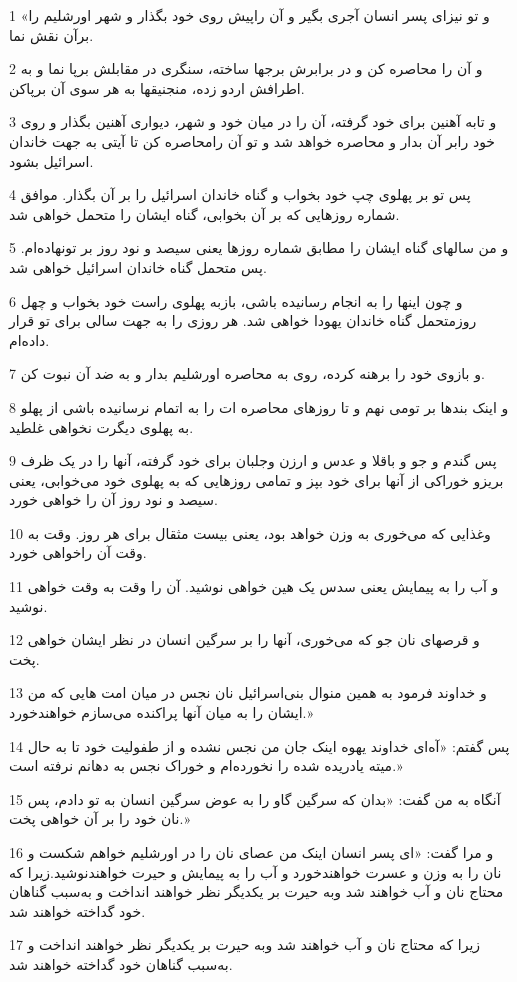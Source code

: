 \par 1 «و تو نیز‌ای پسر انسان آجری بگیر و آن راپیش روی خود بگذار و شهر اورشلیم را برآن نقش نما.
\par 2 و آن را محاصره کن و در برابرش برجها ساخته، سنگری در مقابلش برپا نما و به اطرافش اردو زده، منجنیقها به هر سوی آن برپاکن.
\par 3 و تابه آهنین برای خود گرفته، آن را در میان خود و شهر، دیواری آهنین بگذار و روی خود رابر آن بدار و محاصره خواهد شد و تو آن رامحاصره کن تا آیتی به جهت خاندان اسرائیل بشود.
\par 4 پس تو بر پهلوی چپ خود بخواب و گناه خاندان اسرائیل را بر آن بگذار. موافق شماره روزهایی که بر آن بخوابی، گناه ایشان را متحمل خواهی شد.
\par 5 و من سالهای گناه ایشان را مطابق شماره روزها یعنی سیصد و نود روز بر تونهاده‌ام. پس متحمل گناه خاندان اسرائیل خواهی شد.
\par 6 و چون اینها را به انجام رسانیده باشی، بازبه پهلوی راست خود بخواب و چهل روزمتحمل گناه خاندان یهودا خواهی شد. هر روزی را به جهت سالی برای تو قرار داده‌ام.
\par 7 و بازوی خود را برهنه کرده، روی به محاصره اورشلیم بدار و به ضد آن نبوت کن.
\par 8 و اینک بندها بر تومی نهم و تا روزهای محاصره ات را به اتمام نرسانیده باشی از پهلو به پهلوی دیگرت نخواهی غلطید.
\par 9 پس گندم و جو و باقلا و عدس و ارزن وجلبان برای خود گرفته، آنها را در یک ظرف بریزو خوراکی از آنها برای خود بپز و تمامی روزهایی که به پهلوی خود می‌خوابی، یعنی سیصد و نود روز آن را خواهی خورد.
\par 10 وغذایی که می‌خوری به وزن خواهد بود، یعنی بیست مثقال برای هر روز. وقت به وقت آن راخواهی خورد.
\par 11 و آب را به پیمایش یعنی سدس یک هین خواهی نوشید. آن را وقت به وقت خواهی نوشید.
\par 12 و قرصهای نان جو که می‌خوری، آنها را بر سرگین انسان در نظر ایشان خواهی پخت.
\par 13 و خداوند فرمود به همین منوال بنی‌اسرائیل نان نجس در میان امت هایی که من ایشان را به میان آنها پراکنده می‌سازم خواهندخورد.»
\par 14 پس گفتم: «آه‌ای خداوند یهوه اینک جان من نجس نشده و از طفولیت خود تا به حال میته یادریده شده را نخورده‌ام و خوراک نجس به دهانم نرفته است.»
\par 15 آنگاه به من گفت: «بدان که سرگین گاو را به عوض سرگین انسان به تو دادم، پس نان خود را بر آن خواهی پخت.»
\par 16 و مرا گفت: «ای پسر انسان اینک من عصای نان را در اورشلیم خواهم شکست و نان را به وزن و عسرت خواهندخورد و آب را به پیمایش و حیرت خواهندنوشید.زیرا که محتاج نان و آب خواهند شد وبه حیرت بر یکدیگر نظر خواهند انداخت و به‌سبب گناهان خود گداخته خواهند شد.
\par 17 زیرا که محتاج نان و آب خواهند شد وبه حیرت بر یکدیگر نظر خواهند انداخت و به‌سبب گناهان خود گداخته خواهند شد.

